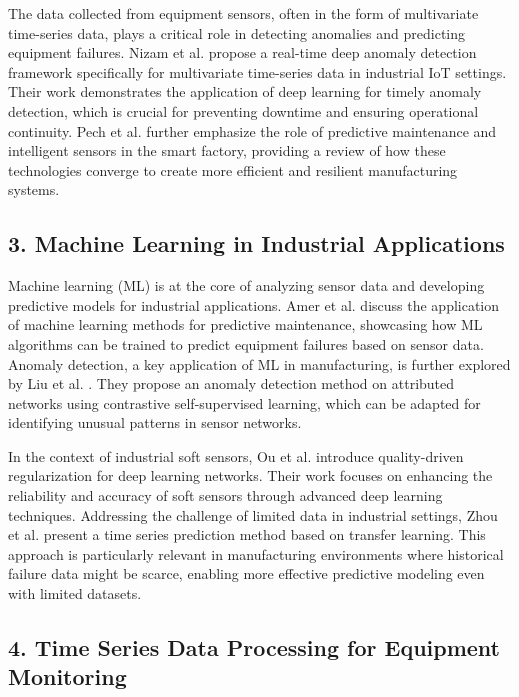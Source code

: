 The data collected from equipment sensors, often in the form of multivariate time-series data, plays a critical role in detecting anomalies and predicting equipment failures. Nizam et al. \cite{nizam-2022} propose a real-time deep anomaly detection framework specifically for multivariate time-series data in industrial IoT settings. Their work demonstrates the application of deep learning for timely anomaly detection, which is crucial for preventing downtime and ensuring operational continuity. Pech et al. \cite{pech-2021} further emphasize the role of predictive maintenance and intelligent sensors in the smart factory, providing a review of how these technologies converge to create more efficient and resilient manufacturing systems.

\subsection*{3. Machine Learning in Industrial Applications}

Machine learning (ML) is at the core of analyzing sensor data and developing predictive models for industrial applications. Amer et al. \cite{amer-2023} discuss the application of machine learning methods for predictive maintenance, showcasing how ML algorithms can be trained to predict equipment failures based on sensor data.  Anomaly detection, a key application of ML in manufacturing, is further explored by Liu et al. \cite{liu-2021}. They propose an anomaly detection method on attributed networks using contrastive self-supervised learning, which can be adapted for identifying unusual patterns in sensor networks.

In the context of industrial soft sensors, Ou et al. \cite{ou-2022} introduce quality-driven regularization for deep learning networks. Their work focuses on enhancing the reliability and accuracy of soft sensors through advanced deep learning techniques.  Addressing the challenge of limited data in industrial settings, Zhou et al. \cite{zhou-2022} present a time series prediction method based on transfer learning. This approach is particularly relevant in manufacturing environments where historical failure data might be scarce, enabling more effective predictive modeling even with limited datasets.

\subsection*{4. Time Series Data Processing for Equipment Monitoring}

